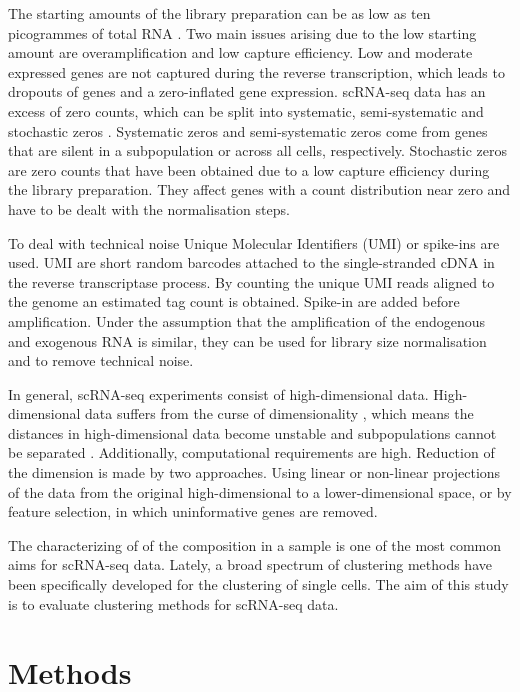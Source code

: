 \documentclass[12pt, a4paper]{article}\usepackage[]{graphicx}\usepackage[]{color}
\begin{document}
The starting amounts of the library preparation can be as low as ten picogrammes of total RNA \citep{picelli2013smart}. Two main issues arising due to the low starting amount are  overamplification and low capture efficiency. Low and moderate expressed genes are not captured during the reverse transcription, which leads to dropouts of genes and a zero-inflated gene expression. scRNA-seq data has an excess of zero counts, which can be split into systematic, semi-systematic and stochastic zeros \citep{lun2016pooling}. Systematic zeros and semi-systematic zeros come from genes that are silent in a subpopulation or across all cells, respectively. 
Stochastic zeros are zero counts that have been obtained due to a low capture efficiency during the library preparation. They affect genes with a count distribution near zero and have to be dealt with the normalisation steps.  
 
To deal with technical noise Unique Molecular Identifiers (UMI) or spike-ins are used. UMI are short random barcodes attached to the single-stranded cDNA in the reverse transcriptase process. By counting the unique UMI reads aligned to the genome an estimated tag count is obtained. Spike-in are added before amplification. Under the assumption that the amplification of the endogenous and exogenous RNA is similar, they can be used for library size normalisation and to remove technical noise. 

In general, scRNA-seq experiments consist of high-dimensional data. High-dimensional data suffers from the curse of dimensionality \citep{wagner2016revealing}, which means the distances in high-dimensional data become unstable and subpopulations cannot be separated \citep{andrews2017identifying}. Additionally, computational requirements are high. Reduction of the dimension is made by two approaches. Using linear or non-linear projections of the data from the original high-dimensional to a lower-dimensional space, or by feature selection, in which uninformative genes are removed.

The characterizing of of the composition in a sample is one of the most common aims for scRNA-seq data. Lately, a broad spectrum of clustering methods have been specifically developed for the clustering of single cells. The aim of this study is to evaluate clustering methods for scRNA-seq data. 
\section{Methods}
\end{document}
